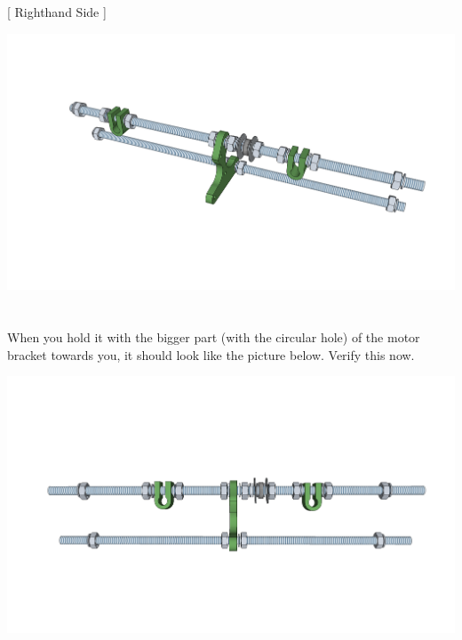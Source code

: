 \documentclass[twoside,a4paper,titlepage]{memoir}
\begin{document}
	[ Righthand Side ]
	\begin{center}
		\includegraphics[width=1\linewidth]{graphics/ch2_5_5.png}
	\end{center}
	
	\section{}
	When you hold it with the bigger part (with the circular hole) of the motor bracket towards you, it should
	look like the picture below. Verify this now.\\
	\begin{center}
		\includegraphics[width=1\linewidth]{graphics/ch2_6.png}
	\end{center}
	
\end{document}
